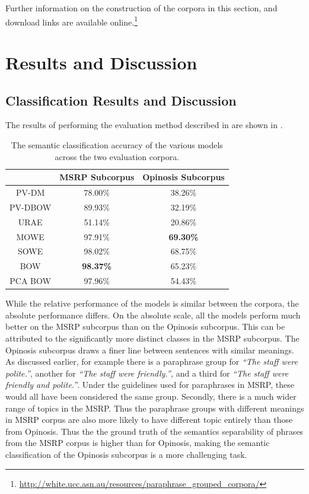 \documentclass[]{book}
\begin{document}
Further information on the construction of the corpora in this section,
and download links are available online.\footnote{\href{http://white.ucc.asn.au/resources/paraphrase_grouped_corpora/}{http://white.ucc.asn.au/resources/paraphrase\_{}grouped\_{}corpora/}}


\section{Results and Discussion}

\label{sec:Results-and-Discussion}


\subsection{Classification Results and Discussion}

The results of performing the evaluation method described in 
are shown in .

\begin{table}
\begin{tabular}{|c|c|c|}
\hline 
 & MSRP Subcorpus & Opinosis Subcorpus\tabularnewline
\hline 
\hline 
 PV-DM & 78.00\% & 38.26\%\tabularnewline
\hline 
 PV-DBOW & 89.93\% & 32.19\%\tabularnewline
\hline 
 URAE & 51.14\% & 20.86\%\tabularnewline
\hline 
 MOWE & 97.91\% & \textbf{69.30\%}\tabularnewline
\hline 
SOWE & 98.02\% & 68.75\%\tabularnewline
\hline 
 BOW & \textbf{98.37\%} & 65.23\%\tabularnewline
\hline 
 PCA BOW & 97.96\% & 54.43\%\tabularnewline
\hline 
\end{tabular}\caption{\label{tab:results}The semantic classification accuracy of the various
models across the two evaluation corpora.}
\end{table}


While the relative performance of the models is similar between the
corpora, the absolute performance differs. On the absolute scale,
all the models perform much better on the MSRP subcorpus than on the
Opinosis subcorpus. This can be attributed to the significantly more
distinct classes in the MSRP subcorpus. The Opinosis subcorpus draws
a finer line between sentences with similar meanings. As discussed
earlier, for example there is a paraphrase group for \emph{``The
staff were polite.''}, another for \emph{``The staff were friendly.'',}
and a third for \emph{``The staff were friendly and polite.''}.
Under the guidelines used for paraphrases in MSRP, these would all
have been considered the same group. Secondly, there is a much wider
range of topics in the MSRP. Thus the paraphrase groups with different
meanings in MSRP corpus are also more likely to have different topic
entirely than those from Opinosis. Thus the the ground truth of the
semantics separability of phrases from the MSRP corpus is higher than
for Opinosis, making the semantic classification of the Opinosis subcorpus
is a more challenging task.
\end{document}
